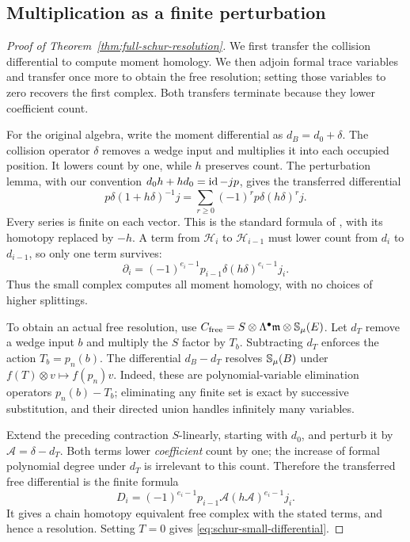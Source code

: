 \subsection{Multiplication as a finite perturbation}

\begin{proof}[Proof of Theorem~\ref{thm:full-schur-resolution}]
We first transfer the collision differential to compute moment homology.
We then adjoin formal trace variables and transfer once more to obtain
the free resolution; setting those variables to zero recovers the first
complex. Both transfers terminate because they lower coefficient count.

For the original algebra, write the moment differential as
$d_B=d_0+\delta$. The collision operator $\delta$ removes a wedge
input and multiplies it into each occupied position. It lowers count
by one, while $h$ preserves count. The perturbation lemma, with our
convention $d_0h+hd_0=\operatorname{id}-jp$, gives the transferred differential
\[
 p\delta(1+h\delta)^{-1}j
       =\sum_{r\ge0}(-1)^r p\delta(h\delta)^rj.
\]
Every series is finite on each vector. This is the standard formula
of \cite[\S2, especially~2.4]{Crainic}, with its homotopy replaced by
$-h$. A term from $\mathcal H_i$ to $\mathcal H_{i-1}$ must lower
count from $d_i$ to $d_{i-1}$, so only one term survives:
\begin{equation}\label{eq:schur-small-differential}
 \partial_i=(-1)^{e_i-1}
          p_{i-1}\delta(h\delta)^{e_i-1}j_i.
\end{equation}
Thus the small complex computes all moment homology, with no choices
of higher splittings.

To obtain an actual free resolution, use
$C_{\mathrm{free}}=S\otimes\Lambda^\bullet\mathfrak m
                    \otimes\mathbb S_\mu(E)$.
Let $d_T$ remove a wedge input $b$ and multiply the $S$ factor by
$T_b$. Subtracting $d_T$ enforces the action $T_b=p_n(b)$.
The differential $d_B-d_T$ resolves $\mathbb S_\mu(B)$ under
$f(T)\otimes v\mapsto f(p_n)v$. Indeed, these are polynomial-variable
elimination operators $p_n(b)-T_b$; eliminating any finite set is
exact by successive substitution, and their directed union handles
infinitely many variables.

Extend the preceding contraction $S$-linearly, starting with $d_0$,
and perturb it by $\mathcal A=\delta-d_T$. Both terms lower
\emph{coefficient} count by one; the increase of formal polynomial
degree under $d_T$ is irrelevant to this count. Therefore the
transferred free differential is the finite formula
\begin{equation}\label{eq:schur-free-differential}
 D_i=(-1)^{e_i-1}
       p_{i-1}\mathcal A(h\mathcal A)^{e_i-1}j_i.
\end{equation}
It gives a chain homotopy equivalent free complex with the stated
terms, and hence a resolution. Setting $T=0$ gives
\eqref{eq:schur-small-differential}.


\end{proof}

